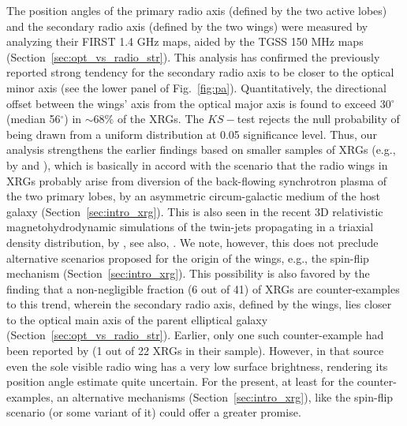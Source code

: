 \documentclass[twocolumn]{aastex62}
\begin{document}
The position angles of the primary radio axis (defined by the two
active lobes) and the secondary radio axis (defined by the two wings)
were measured by analyzing their FIRST 1.4 GHz maps, aided by the TGSS
150 MHz maps (Section~\ref{sec:opt_vs_radio_str}). This analysis has 
confirmed the previously reported strong tendency for the secondary 
radio axis to be closer to the optical minor axis (see the lower panel of 
Fig.~\ref{fig:pa}). Quantitatively, the directional offset between the
wings' axis from the optical major axis is found to exceed 30$^{\circ}$
(median 56$^{\circ}$) in $\sim 68\%$ of the XRGs.  The $KS-$test rejects the null
probability of being drawn from a uniform distribution at 
  0.05 significance level. Thus, our analysis strengthens
the earlier findings based on smaller samples of XRGs (e.g., by
\citealt{Capetti2002A&A...394...39C} and
\citealt{Gillone2016A&A...587A..25G}), which is basically in accord with 
the scenario that the radio wings in XRGs probably arise from diversion
of the back-flowing synchrotron plasma of the two primary lobes, by an
asymmetric circum-galactic medium of the host galaxy
(Section~\ref{sec:intro_xrg}). This is also seen in the recent 3D 
relativistic magnetohydrodynamic simulations of the twin-jets propagating 
in a triaxial density distribution, by \citet[][]{Rossi2017A&A...606A..57R}, 
see also, \citet[][]{Hodges2011ApJ...733...58H}. We note, however, this 
does not preclude alternative scenarios proposed for the origin of the 
wings, e.g., the spin-flip mechanism (Section~\ref{sec:intro_xrg}). This 
possibility is also favored by the finding that a non-negligible fraction 
(6 out of 41) of XRGs are counter-examples to this trend, wherein the 
secondary radio axis, defined by the wings, lies closer to the optical 
main axis of the parent elliptical galaxy (Section~\ref{sec:opt_vs_radio_str}). 
Earlier, only one such counter-example had been reported by \citet{Gillone2016A&A...587A..25G} 
(1 out of 22 XRGs in their sample). However, in that source even the sole 
visible radio wing has a very low surface brightness, rendering its 
position angle estimate quite uncertain. For the present, at least for 
the counter-examples, an alternative mechanisms (Section~\ref{sec:intro_xrg}), 
like the spin-flip scenario (or some variant of it) could offer a greater 
promise.
\end{document}
